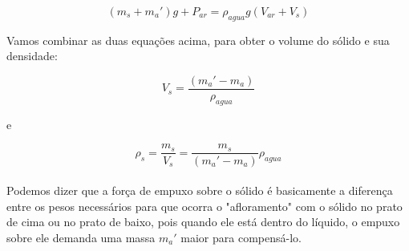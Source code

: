 \[ (m_s + m_a')g + P_{ar} = \rho _{agua} g (V_{ar} + V_s) \]

Vamos combinar as duas equações acima, para obter o volume do sólido e sua densidade:

\[ V_s = \frac{(m_a' - m_a)}{\rho _{agua}} \]

e

\[ \rho _s = \frac{m_s}{V_s} = \frac{m_s}{(m_a' - m_a)} \rho _{agua} \]\\

Podemos dizer que a força de empuxo sobre o sólido é basicamente a diferença entre os pesos necessários para que ocorra o "afloramento" com o sólido no prato de cima ou no prato de baixo, pois quando ele está dentro do líquido, o empuxo sobre ele demanda uma massa $m_a'$ maior para compensá-lo. \\


 

